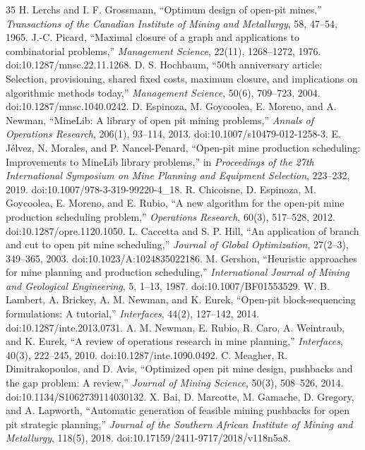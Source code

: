 \documentclass[11pt]{article}
\begin{document}
\begin{thebibliography}{35}
 H. Lerchs and I. F. Grossmann, ``Optimum design of open-pit mines,'' \emph{Transactions of the Canadian Institute of Mining and Metallurgy}, 58, 47--54, 1965.
 J.-C. Picard, ``Maximal closure of a graph and applications to combinatorial problems,'' \emph{Management Science}, 22(11), 1268--1272, 1976. doi:10.1287/mnsc.22.11.1268.
 D. S. Hochbaum, ``50th anniversary article: Selection, provisioning, shared fixed costs, maximum closure, and implications on algorithmic methods today,'' \emph{Management Science}, 50(6), 709--723, 2004. doi:10.1287/mnsc.1040.0242.
 D. Espinoza, M. Goycoolea, E. Moreno, and A. Newman, ``MineLib: A library of open pit mining problems,'' \emph{Annals of Operations Research}, 206(1), 93--114, 2013. doi:10.1007/s10479-012-1258-3.
 E. J\'elvez, N. Morales, and P. Nancel-Penard, ``Open-pit mine production scheduling: Improvements to MineLib library problems,'' in \emph{Proceedings of the 27th International Symposium on Mine Planning and Equipment Selection}, 223--232, 2019. doi:10.1007/978-3-319-99220-4\_18.
 R. Chicoisne, D. Espinoza, M. Goycoolea, E. Moreno, and E. Rubio, ``A new algorithm for the open-pit mine production scheduling problem,'' \emph{Operations Research}, 60(3), 517--528, 2012. doi:10.1287/opre.1120.1050.
 L. Caccetta and S. P. Hill, ``An application of branch and cut to open pit mine scheduling,'' \emph{Journal of Global Optimization}, 27(2--3), 349--365, 2003. doi:10.1023/A:1024835022186.
 M. Gershon, ``Heuristic approaches for mine planning and production scheduling,'' \emph{International Journal of Mining and Geological Engineering}, 5, 1--13, 1987. doi:10.1007/BF01553529.
 W. B. Lambert, A. Brickey, A. M. Newman, and K. Eurek, ``Open-pit block-sequencing formulations: A tutorial,'' \emph{Interfaces}, 44(2), 127--142, 2014. doi:10.1287/inte.2013.0731.
 A. M. Newman, E. Rubio, R. Caro, A. Weintraub, and K. Eurek, ``A review of operations research in mine planning,'' \emph{Interfaces}, 40(3), 222--245, 2010. doi:10.1287/inte.1090.0492.
 C. Meagher, R. Dimitrakopoulos, and D. Avis, ``Optimized open pit mine design, pushbacks and the gap problem: A review,'' \emph{Journal of Mining Science}, 50(3), 508--526, 2014. doi:10.1134/S1062739114030132.
 X. Bai, D. Marcotte, M. Gamache, D. Gregory, and A. Lapworth, ``Automatic generation of feasible mining pushbacks for open pit strategic planning,'' \emph{Journal of the Southern African Institute of Mining and Metallurgy}, 118(5), 2018. doi:10.17159/2411-9717/2018/v118n5a8.

\end{thebibliography}
\end{document}
